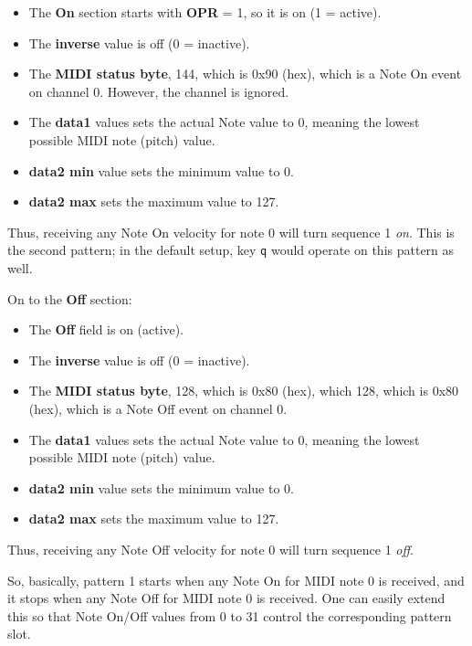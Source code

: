    \begin{itemize}
      \item The \textbf{On} section starts with \textbf{OPR} = 1,
         so it is on (1 = active).
      \item The \textbf{inverse} value is off (0 = inactive).
      \item The \textbf{MIDI status byte}, 144, which is 0x90 (hex), which
         is a Note On event on channel 0.  However, the channel is ignored.
      \item The \textbf{data1} values sets the actual Note value to 0,
         meaning the lowest possible MIDI note (pitch) value.
      \item \textbf{data2 min} value sets the minimum value to 0.
      \item \textbf{data2 max} sets the maximum value to 127.
   \end{itemize}

   Thus, receiving any Note On velocity for note 0 will turn sequence
   1 \textsl{on}.  This is the second pattern; in the default setup, key
   \texttt{q} would operate on this pattern as well.
   
   On to the \textbf{Off} section:

   \begin{itemize}
      \item The \textbf{Off} field is on (active).
      \item The \textbf{inverse} value is off (0 = inactive).
      \item The \textbf{MIDI status byte}, 128, which is 0x80 (hex), which
         128, which is 0x80 (hex), which is a Note Off event on channel 0.
      \item The \textbf{data1} values sets the actual Note value to 0,
         meaning the lowest possible MIDI note (pitch) value.
      \item \textbf{data2 min} value sets the minimum value to 0.
      \item \textbf{data2 max} sets the maximum value to 127.
   \end{itemize}

   Thus, receiving any Note Off velocity for note 0 will turn sequence
   1 \textsl{off}.

   So, basically, pattern 1 starts when any Note On for MIDI note 0
   is received, and it stops when any Note Off for MIDI note 0 is received.  
   One can easily extend this so that Note On/Off values from 0 to 31
   control the corresponding pattern slot.

